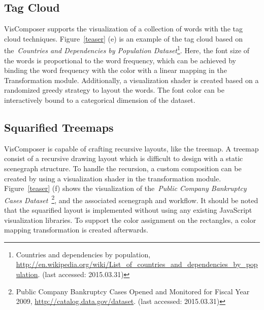 \subsection{Tag Cloud}
VisComposer supports the visualization of a collection of words with the tag cloud  techniques. Figure~\ref{teaser} (e) is an example of the tag cloud based on the~\emph{Countries and Dependencies by Population Dataset}\footnote{Countries and dependencies by population, \url{http://en.wikipedia.org/wiki/List\_of\_countries\_and\_dependencies\_by\_population}. (last accessed: 2015.03.31)}. Here, the font size of the words is  proportional to the  word frequency, which can be achieved by binding the word frequency with the color with a linear mapping in the Transformation module. Additionally, a visualization shader is created based on a randomized greedy strategy to layout the words. The font color can be interactively bound to a categorical dimension of the dataset.


\subsection{Squarified Treemaps}
VisComposer is capable of crafting recursive layouts, like the treemap. A treemap consist of a recursive drawing layout which is difficult to design with a static scenegraph structure. To handle the recursion, a custom composition can be created by using a visualization shader in the transformation module. Figure~\ref{teaser} (f) shows the visualization of the~\emph{Public Company Bankruptcy Cases Dataset}~\footnote{Public Company Bankruptcy Cases Opened and Monitored for Fiscal Year 2009, \url{http://catalog.data.gov/dataset}. (last accessed: 2015.03.31)}, and the associated scenegraph and workflow. It should be noted that the squarified layout is implemented without using any existing JavaScript visualization libraries. To support the color assignment on the rectangles, a color mapping transformation is created afterwards.



